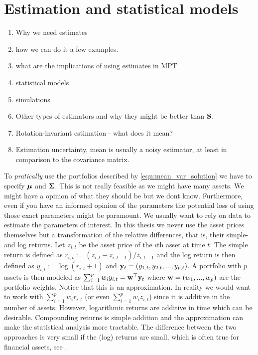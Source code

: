\documentclass[]{book}\usepackage{knitr}
\begin{document}
\chapter{Estimation and statistical models}\label{ch:estim}

\begin{enumerate}
  \item Why we need estimates
  \item how we can do it a few examples.
  \item what are the implications of using estimates in MPT
  \item statistical models
  \item simulations
	\item Other types of estimators and why they might be better than $\mathbf{S}$.
	\item Rotation-invariant estimation - what does it mean?
	\item Estimation uncertainty, mean is usually a noisy estimator, at least in comparison to the covariance matrix.
\end{enumerate}


To \textit{pratically} use the portfolios described by \eqref{eqn:mean_var_solution} we have to specify $\mbox{\boldmath$\mu$}$ and $\mathbf{\Sigma}$. 
This is not really feasible as we might have many assets. 
We might have a opinion of what they should be but we dont know. 
Furthermore, even if you have an informed opinion of the parameters the potential loss of using those exact parameters might be paramount. 
We usually want to rely on data to estimate the parameters of interest. 
In this thesis we never use the asset prices themselves but a transformation of the relative differences, that is, their simple- and log returns. 
Let $z_{i,t}$ be the asset price of the $i$th asset at time $t$. 
The simple return is defined as $r_{i,t} := (z_{i,t}-z_{i,t-1})/z_{i,t-1}$ and the log return is then defined as $y_{i,t} := \log(r_{i,t} + 1)$ and $\mathbf{y}_t=(y_{1,t},y_{2,t},..., y_{p,t})$.
A portfolio with $p$ assets is then modeled as $\sum_{i=1}^p w_i y_{i,t} = \mathbf{w}^\top \mathbf{y}_t$ where $\mathbf{w}=(w_1, ..., w_p)$ are the portfolio weights.
Notice that this is an approximation. 
In reality we would want to work with $\sum_{i=1}^p w_i r_{i,t}$ (or even $\sum_{i=1}^p w_i z_{i,t}$) since it is additive in the number of assets. 
However, logarithmic returns are additive in time which can be desirable. 
Compounding returns is simple addition and the approximation can make the statistical analysis more tractable. 
The difference between the two approaches is very small if the (log) returns are small, which is often true for financial assets, see \citet[p. 5]{tsay2005analysis}. 
\end{document}
